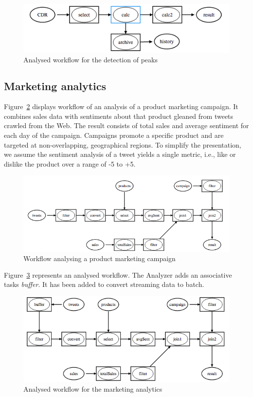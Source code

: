 \documentclass[12pt,openany,onecolumn]{book}
\begin{document}
\begin{figure}[h]
\centering
\includegraphics[scale=0.75]{figs/peakdetection-a}
\caption{Analysed workflow for the detection of peaks}\label{fig:use_case_peaks_analysed}
\end{figure}

\subsection{Marketing analytics}
Figure~\ref{fig:use_tweets} displays workflow of an analysis of a product marketing campaign. It combines sales data with sentiments about that product gleaned from tweets crawled from the Web. The result consists of total sales and average sentiment for each day of the campaign. Campaigns promote a specific product and are targeted at non-overlapping, geographical regions. To simplify the presentation, we assume the sentiment analysis of a tweet yields a single metric, i.e., like or dislike the product over a range of -5 to +5.

\begin{figure}
\centering
\includegraphics[width=\linewidth]{figs/tweets}
\caption{Workflow analysing a product marketing campaign}\label{fig:use_tweets}
\end{figure}

Figure~\ref{fig:use_tweets_analysed} represents an analysed workflow.
The Analyzer adds an associative tasks \emph{buffer}. It has been added to convert streaming data to batch.
\begin{figure}
\centering
\includegraphics[width=\linewidth]{figs/tweets-a}
\caption{Analysed workflow for the marketing analytics}\label{fig:use_tweets_analysed}
\end{figure}
\end{document}
